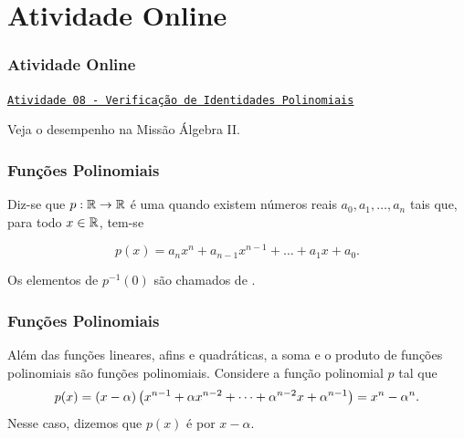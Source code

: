 \documentclass[brazil, notheorems, 10pt]{beamer}
\begin{document}
\section{Atividade Online}
\begin{frame}
\frametitle{Atividade Online} %

\href{https://pt.khanacademy.org/math/algebra2/polynomial-functions/proving-polynomial-identities/e/polynomial-identities}
{{\tt Atividade 08 - Verificação de Identidades Polinomiais}}



Veja o desempenho na Missão Álgebra II.


\end{frame}


\begin{frame}
\frametitle{Funções Polinomiais} %

\begin{Def}
Diz-se que $p: \mathbb{R} \to \mathbb{R}$ é uma  quando
existem números reais $a_0, a_1, \dots , a_n$ tais que, para todo $x
\in \mathbb{R}$, tem-se

\begin{equation}\label{funcpol}
p(x) = a_n x^n + a_{n-1} x^{n-1} + \dots + a_1 x + a_0.
\end{equation}

Os elementos de $p^{-1}(0)$ são chamados de .
\end{Def}

\end{frame}




\begin{frame}
\frametitle{Funções Polinomiais} %

\begin{Exem}
Além das funções lineares, afins e quadráticas, a soma e o produto
de funções polinomiais são funções polinomiais. Considere a função
polinomial $p$ tal que $$p(x) = \left(x - \alpha\right) \left(x^{n-1} +
\alpha x^{n-2} + \dots + \alpha^{n-2}x+ \alpha^{n-1}\right)=x^n -
\alpha^n.$$ Nesse caso, dizemos que $p(x)$ é  por $x-
\alpha$.
\end{Exem}

\end{frame}
\end{document}
